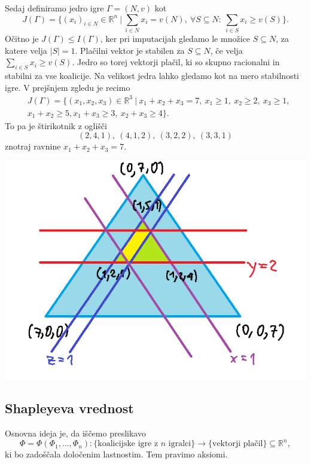 \documentclass[10pt, a4paper]{article}
\newcommand{\R}{\mathbb {R}}
\begin{document}
Sedaj definiramo jedro igre $\Gamma = (N, v)$ kot 
$$J(\Gamma) = \{(x_i)_{i \in N} \in \R^n\ |\ \sum_{i \in N} x_i = v(N),\ \forall S \subseteq N:\ \sum_{i \in S} x_i \geq v(S)\}.$$
Očitno je $J(\Gamma) \leq I(\Gamma)$, ker pri imputacijah gledamo le množice $S \subseteq N$, za katere velja $|S| = 1$.
Plačilni vektor je stabilen za $S \subseteq N$, če velja 
$\sum_{i \in S} x_i \geq v(S)$. Jedro so torej vektorji plačil, ki so skupno racionalni 
in stabilni za vse koalicije. Na velikost jedra lahko gledamo kot na mero stabilnosti igre.
V prejšnjem zgledu je recimo 
\begin{align*}
  &J(\Gamma) = \{(x_1, x_2, x_3) \in \R^3\ |\ x_1 + x_2 + x_3 = 7,\ x_1 \geq 1,\ x_2 \geq 2,\ x_3 \geq 1,\\
  &x_1 + x_2 \geq 5, x_1 + x_3 \geq 3,\ x_2 + x_3 \geq 4\}.
\end{align*}
To pa je štirikotnik z oglišči 
$$(2, 4, 1),\ (4, 1, 2),\ (3, 2, 2),\ (3, 3, 1)$$
znotraj ravnine $x_1 + x_2 + x_3 = 7$.
\begin{center}
  \includegraphics[scale=0.8]{images/slika3.png}
\end{center}

\subsection{Shapleyeva vrednost}

Osnovna ideja je, da iščemo preslikavo 
$$\Phi = \Phi(\Phi_1, \dots, \Phi_n): \{\text{koalicijske igre z $n$ igralci}\} \to \{\text{vektorji plačil}\} \subseteq \R^n,$$
ki bo zadoščala določenim lastnostim. Tem pravimo aksiomi.
\end{document}
